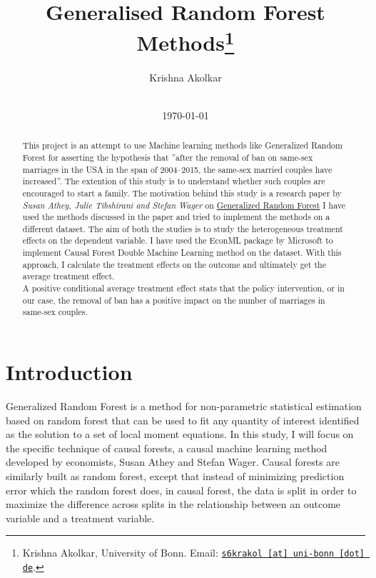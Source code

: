 \documentclass[11pt, a4paper, leqno]{article}
\begin{document}
\title{Generalised Random Forest Methods\thanks{Krishna Akolkar, University of Bonn. Email: \href{mailto:s6krakol@uni-bonn.de}{\nolinkurl{s6krakol [at] uni-bonn [dot] de}}.}}

\author{Krishna Akolkar}

\date{
    \\[1ex]
    \today
}
\maketitle
\begin{abstract} This project is an attempt to use Machine learning methods like Generalized Random Forest for asserting the hypothesis that
''after the removal of ban on same-sex marriages in the USA in the span of 2004--2015, the same-sex married couples have increased''.
The extention of this study is to understand whether such couples are encouraged to start a family.
The motivation behind this study is a research paper by \textit{Susan Athey, Julie Tibshirani and Stefan Wager} on \href{https://arxiv.org/pdf/1610.01271}{Generalized Random Forest}
I have used the methods discussed in the paper and tried to implement the methods on a different dataset.
The aim of both the studies is to study the heterogeneous treatment effects on the dependent variable.
I have used the EconML package by Microsoft to implement Causal Forest Double Machine Learning method on the dataset.
With this approach, I calculate the treatment effects on the outcome and ultimately get the average treatment effect.\\

A positive conditional average treatment effect stats that the policy intervention, or in our case, the removal of ban has a positive
impact on the number of marriages in same-sex couples.
\end{abstract}

\clearpage

\section{Introduction}\label{sec:introduction}

 Generalized Random Forest is a method for non-parametric statistical estimation based on random forest that can be used to fit any quantity
 of interest identified as the solution to a set of local moment equations.
 In this study, I will focus on the specific technique of causal forests, a causal machine learning method developed by economists, Susan Athey and Stefan Wager.
 Causal forests are similarly built as random forest, except that instead of minimizing prediction error which the random forest does, in causal forest, the data is split in order to
 maximize the difference across splits in the relationship between an outcome variable and a treatment variable.
\end{document}
